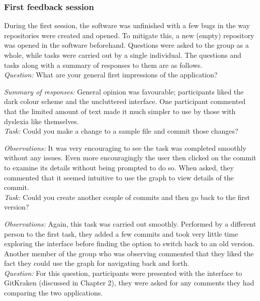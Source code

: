 \subsubsection{First feedback session}

During the first session, the software was unfinished with a few bugs in the way repositories were created and opened. To mitigate this, a new (empty) repository was opened in the software beforehand. Questions were asked to the group as a whole, while tasks were carried out by a single individual. The questions and tasks along with a summary of responses to them are as follows.\\

\noindent \emph{Question: } What are your general first impressions of the application?

\noindent \emph{Summary of responses:} General opinion was favourable; participants liked the dark colour scheme and the uncluttered interface. One participant commented that the limited amount of text made it much simpler to use by those with dyslexia like themselves. \\

\noindent \emph{Task: } Could you make a change to a sample file and commit those changes?

\noindent \emph{Observations: } It was very encouraging to see the task was completed smoothly without any issues. Even more encouragingly the user then clicked on the commit to examine its details without being prompted to do so. When asked, they commented that it seemed intuitive to use the graph to view details of the commit.\\

\noindent \emph{Task: } Could you create another couple of commits and then go back to the first version?

\noindent \emph{Observations: } Again, this task was carried out smoothly. Performed by a different person to the first task, they added a few commits and took very little time exploring the interface before finding the option to switch back to an old version. Another member of the group who was observing commented that they liked the fact they could use the graph for navigating back and forth.\\

\noindent \emph{Question: } For this question, participants were presented with the interface to GitKraken (discussed in Chapter 2), they were asked for any comments they had comparing the two applications.

